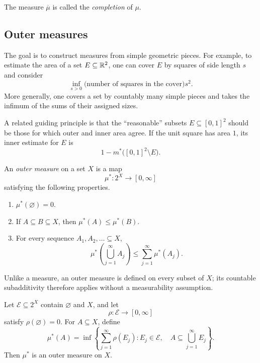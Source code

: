 The measure $\overline\mu$ is called the \emph{completion} of $\mu$.

\subsection{Outer measures}

The goal is to construct measures from simple geometric pieces. For
example, to estimate the area of a set $E\subseteq\mathbb{R}^2$, one can
cover $E$ by squares of side length $s$ and consider
\[
  \inf_{s>0}\bigl(\text{number of squares in the cover}\bigr)s^2.
\]
More generally, one covers a set by countably many simple pieces and
takes the infimum of the sums of their assigned sizes.

A related guiding principle is that the ``reasonable'' subsets
$E\subseteq[0,1]^2$ should be those for which outer and inner area agree.
If the unit square has area $1$, its inner estimate for $E$ is
\[
  1-m^*\bigl([0,1]^2\setminus E\bigr).
\]

\begin{definition}
  An \emph{outer measure} on a set $X$ is a map
  \[
    \mu^*\colon 2^X\longrightarrow[0,\infty]
  \]
  satisfying the following properties.
  \begin{enumerate}[label=(\roman*)]
    \item $\mu^*(\varnothing)=0$.
    \item If $A\subseteq B\subseteq X$, then
      $\mu^*(A)\leq\mu^*(B)$.
    \item For every sequence $A_1,A_2,\ldots\subseteq X$,
      \[
        \mu^*\left(\bigcup_{j=1}^{\infty}A_j\right)
        \leq\sum_{j=1}^{\infty}\mu^*(A_j).
      \]
  \end{enumerate}
\end{definition}

Unlike a measure, an outer measure is defined on every subset of $X$;
its countable subadditivity therefore applies without a measurability
assumption.

\begin{proposition}
  Let $\mathcal E\subseteq 2^X$ contain $\varnothing$ and $X$, and let
  \[
    \rho\colon\mathcal E\longrightarrow[0,\infty]
  \]
  satisfy $\rho(\varnothing)=0$. For $A\subseteq X$, define
  \[
    \mu^*(A)
    =\inf\left\{
      \sum_{j=1}^{\infty}\rho(E_j):
      E_j\in\mathcal E,\quad
      A\subseteq\bigcup_{j=1}^{\infty}E_j
    \right\}.
  \]
  Then $\mu^*$ is an outer measure on $X$.
\end{proposition}

